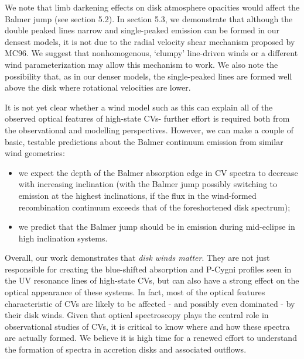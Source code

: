 \documentclass[preprint, a4paper, 11pt]{aastex}
\begin{document}
We note that limb darkening effects on disk atmosphere opacities
would affect the Balmer jump (see section 5.2). In section 5.3, we demonstrate that
although the double peaked lines narrow and 
single-peaked emission can be formed in our densest models, 
it is not due to the radial velocity shear mechanism proposed by MC96.
We suggest that nonhomogenous, `clumpy' line-driven winds or a different
wind parameterization may allow this mechanism to work.
We also note the possibility that, as in our denser models, 
the single-peaked lines are formed well above the disk where 
rotational velocities are lower.



It is not yet clear whether a wind model such as this can
explain all of the observed optical features of high-state CVs-
further effort is required both from the observational
and modelling perspectives.
However, we can make a couple of basic,
testable predictions about the Balmer continuum emission
from similar wind geometries:
\begin{itemize}
	\item we expect the depth of the Balmer absorption edge in CV
          spectra to decrease with increasing inclination (with the
          Balmer jump possibly switching to emission at the highest
          inclinations, if the flux in the wind-formed recombination
          continuum exceeds that of the foreshortened disk spectrum);
	\item we predict that the Balmer jump should be in emission
          during mid-eclipse in high inclination systems.
\end{itemize}

\smallskip


Overall, our work demonstrates that {\sl disk winds matter}. They are
not just responsible for creating the blue-shifted absorption and
P-Cygni profiles seen in the UV resonance lines of high-state CVs, but
can also have a strong effect on the optical appearance of these
systems. In fact, most of the optical features characteristic of CVs
are likely to be affected - and possibly even dominated - by their disk
winds. Given that optical spectroscopy plays the central role in
observational studies of CVs, it is critical to know 
where and how these spectra are actually formed. We believe it is high
time for a renewed effort to understand the formation of spectra in
accretion disks and associated outflows. 
\end{document}
